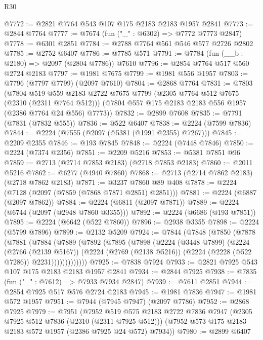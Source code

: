 \begin{lexlean}{R30}
\begin{coremodule}
@7772 := @2821 @7764 @543 @107 @175 @2183 @2183 @1957 @2841
@7773 := @2844 @7764
@7777 := @7674 (fun ("_" : @6302) => @7772 @7773 @2847)
@7778 := @6301 @2851
@7784 := @2788 @7764 @561 @546 @577 @2726 @2802
@7785 := @2752 @6407
@7786 := @7785 @571
@7791 := @7784 (fun (__b : @2180) => @2097 (@2804 @7786)) @7610
@7796 := @2854 @7764 @517 @560 @2724 @2183
@7797 := @1981 @7675
@7799 := @1981 @556 @1957
@7803 := @7796 (@7797 @7799) (@2097 @7610)
@7804 := @2868 @7764
@7831 := @7803
    (@7804
      @519
      @559
      @2183
      @2722
      @7675
      @7799
      (@2305 @7764 @512 @7675 (@2310 (@2311 @7764 @512)))
      (@7804 @557 @175 @2183 @2183 @556 @1957 (@2386 @7764 @24 @556) @7773))
@7832 := @2899 @7608
@7835 := @7791 (@7831 (@7832 @555))
@7836 := @522 @6407
@7838 := @2224 (@7599 @7836)
@7844 := @2224 (@7555 (@2097 (@5381 (@1991 @2355) @7267)))
@7845 := @2209 @2355
@7846 := @193 @7845
@7848 := @2224 (@7448 @7846)
@7850 := @2224 (@7374 @2356)
@7851 := @2209 @5216
@7853 := @5381 @7851 @96
@7859 := @2713 (@2714 @7853 @2183) (@2718 @7853 @2183)
@7860 := @2011 @5216
@7862 := @6277 (@4940 @7860)
@7868 := @2713 (@2714 @7862 @2183) (@2718 @7862 @2183)
@7871 := @3237 @7860 @89 @408
@7878 := @2224 (@7128 (@2097 (@7859 (@7868 @7871 @2851) @2851)))
@7881 := @2224 (@6887 (@2097 @7862))
@7884 := @2224 (@6811 (@2097 @7871))
@7889 := @2224 (@6744 (@2097 (@2948 @7860 @3355)))
@7892 := @2224 (@6686 (@193 @7851))
@7895 := @2224 (@6642 (@522 @7860))
@7896 := @2938 @3355
@7898 := @2224 (@5799 @7896)
@7899 := @2132 @5209
@7924 := @7844
    (@7848
      (@7850
        (@7878
          (@7881
            (@7884
              (@7889
                (@7892
                  (@7895
                    (@7898
                      (@2224
                        (@3448 @7899)
                        (@2224
                          (@2766 (@2139 @5167))
                          (@2224
                            (@2769 (@2138 @5216))
                            (@2224 (@2228 (@522 @7286)) @2231)))))))))))))
@7925 := @7838 @7924
@7933 := @2821 @7925 @543 @107 @175 @2183 @2183 @1957 @2841
@7934 := @2844 @7925
@7938 := @7835 (fun ("_" : @7612) => @7933 @7934 @2847)
@7939 := @7611 @2851
@7944 := @2854 @7925 @517 @576 @2724 @2183
@7945 := @1981 @7836
@7947 := @1981 @572 @1957
@7951 := @7944 (@7945 @7947) (@2097 @7786)
@7952 := @2868 @7925
@7979 := @7951
    (@7952
      @519
      @575
      @2183
      @2722
      @7836
      @7947
      (@2305 @7925 @512 @7836 (@2310 (@2311 @7925 @512)))
      (@7952 @573 @175 @2183 @2183 @572 @1957 (@2386 @7925 @24 @572) @7934))
@7980 := @2899 @6407

\end{coremodule}
\end{lexlean}
